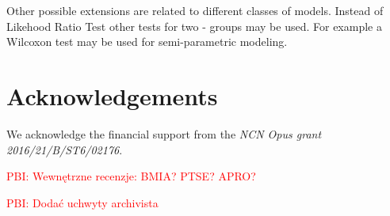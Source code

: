 \documentclass[12pt]{article}
\newcommand{\todo}{\textcolor{red}}
\begin{document}
Other possible extensions are related to different classes of models. Instead of Likehood Ratio Test other tests for two - groups may be used. For example a Wilcoxon test may be used for semi-parametric modeling. 


\section{Acknowledgements}

We acknowledge the financial support from the \emph{NCN Opus grant 2016/21/B/ST6/02176}.

\todo{PBI: Wewnętrzne recenzje: BMIA? PTSE? APRO?}

\todo{PBI: Dodać uchwyty archivista}





\end{document}
